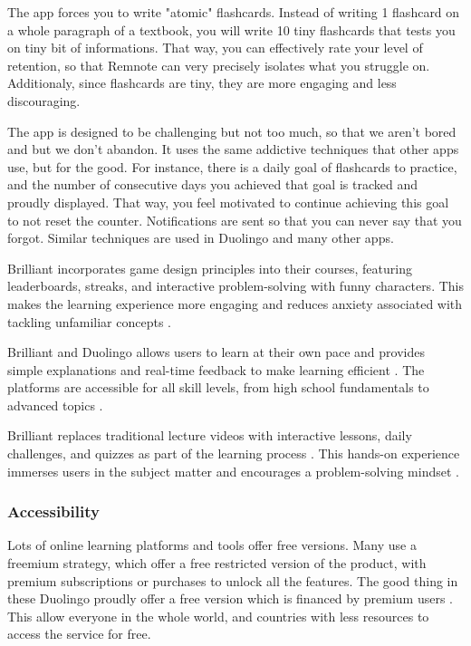 \documentclass{article}
\begin{document}
The app forces you to write "atomic" flashcards. Instead of writing 1
flashcard on a whole paragraph of a textbook, you will write 10 tiny
flashcards that tests you on tiny bit of informations.
That way, you can effectively rate your level of retention,
so that Remnote can very precisely isolates what you struggle on.
Additionaly, since flashcards are tiny, they are more engaging and
less discouraging.

The app is designed to be challenging but not too much, so that
we aren't bored and but we don't abandon. It uses the same addictive
techniques that other apps use, but for the good. For instance,
there is a daily goal of flashcards to practice, and the number
of consecutive days you achieved that goal is tracked and proudly
displayed. That way, you feel motivated to continue achieving this
goal to not reset the counter. Notifications are sent so that
you can never say that you forgot.  Similar techniques are used in Duolingo
and many other apps.

Brilliant incorporates game design principles into their courses,
featuring leaderboards, streaks, and interactive problem-solving
with funny characters. This makes the learning experience more
engaging and reduces anxiety associated with tackling unfamiliar
concepts \cite{fordhamram_brilliant_review}.

Brilliant and Duolingo allows users to learn at their own
pace and provides simple explanations and real-time feedback
to make learning efficient \cite{fordhamram_brilliant_review}.
The platforms are accessible for all skill levels,
from high school fundamentals to advanced topics
\cite{fordhamram_brilliant_review}.

Brilliant replaces traditional lecture videos with interactive
lessons, daily challenges, and quizzes as part of the
learning process \cite{fordhamram_brilliant_review}.
This hands-on experience immerses users in the subject matter
and encourages a problem-solving mindset
\cite{edwize_brilliant_review}.

\subsubsection{Accessibility}
Lots of online learning platforms and tools offer free versions.
Many use a freemium strategy, which offer a free restricted version
of the product, with premium subscriptions or purchases to unlock
all the features. The good thing in these Duolingo proudly offer
a free version which is financed by premium users
\cite{make_learning_as_addictive_as_social_media}.
This allow everyone in the whole world, and countries
with less resources to access the service for free.
\end{document}

